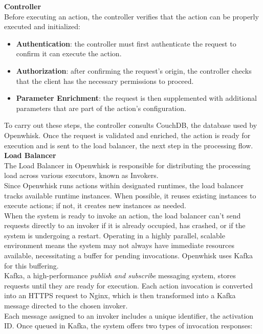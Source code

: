 \textbf{Controller}\\
Before executing an action, the controller verifies that the action can be properly executed and initialized:
\begin{itemize}
    \item \textbf{Authentication}: the controller must first authenticate the request to confirm it can execute the action.
    \item \textbf{Authorization}: after confirming the request’s origin, the controller checks that the client has the necessary permissions to proceed.
    \item \textbf{Parameter Enrichment}: the request is then supplemented with additional parameters that are part of the action’s configuration.
\end{itemize}
To carry out these steps, the controller consults CouchDB, the database used by Openwhisk. Once the request is validated and enriched, the action is ready for execution and is sent to the load balancer, the next step in the processing flow.\vspace{14pt}\\
\textbf{Load Balancer}\\
The Load Balancer in Openwhisk is responsible for distributing the processing load across various executors, known as Invokers.\\
Since Openwhisk runs actions within designated runtimes, the load balancer tracks available runtime instances. When possible, it reuses existing instances to execute actions; if not, it creates new instances as needed.\vspace{14pt}\\
When the system is ready to invoke an action, the load balancer can't send requests directly to an invoker if it is already occupied, has crashed, or if the system is undergoing a restart. Operating in a highly parallel, scalable environment means the system may not always have immediate resources available, necessitating a buffer for pending invocations. Openwhisk uses Kafka for this buffering.\vspace{14pt}\\
Kafka, a high-performance \textit{publish and subscribe} messaging system, stores requests until they are ready for execution. Each action invocation is converted into an HTTPS request to Nginx, which is then transformed into a Kafka message directed to the chosen invoker.\\
Each message assigned to an invoker includes a unique identifier, the activation ID. Once queued in Kafka, the system offers two types of invocation responses:
